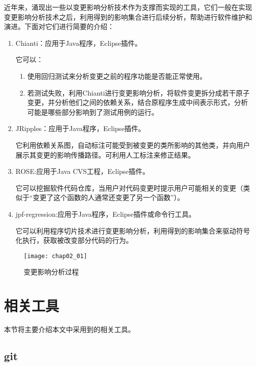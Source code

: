 近年来，涌现出一些以变更影响分析技术作为支撑而实现的工具，它们一般在实现变更影响分析技术之后，利用得到的影响集合进行后续分析，帮助进行软件维护和演进。下面对它们进行简要的介绍：
\begin{enumerate}
	\item Chianti：应用于Java程序，Eclipse插件\cite{ren2004chianti}。

	它可以：
	\begin{enumerate}
	
		\item 使用回归测试来分析变更之前的程序功能是否能正常使用。
		\item 若测试失败，利用Chianti进行变更影响分析，将软件变更拆分成若干原子变更，并分析他们之间的依赖关系，结合原程序生成中间表示形式，分析可能是哪些部分影响到了测试用例的运行。
	\end{enumerate}
	
	
	\item JRipples：应用于Java程序，Eclipse插件\cite{buckner2005jripples,rajlich2004incremental}。
	
	它利用依赖关系图，自动标注可能受到被变更的类所影响的其他类，并向用户展示其变更的影响传播路径。可利用人工标注来修正结果。
	
	\item ROSE:应用于Java CVS工程，Eclipse插件\cite{zimmermann2005mining}。

	它可以挖掘软件代码仓库，当用户对代码变更时提示用户可能相关的变更（类似于“变更了这个函数的人通常还变更了另一个函数”）。
	
	
	\item jpf-regression:应用于Java程序，Eclipse插件或命令行工具\cite{person2011directed}。

	它可以利用程序切片技术进行变更影响分析，利用得到的影响集合来驱动符号化执行，获取被改变部分代码的行为。
\end{enumerate}

\begin{figure}[H]
	\centering
	\texttt{[image: chap02\_01]}
	\caption {变更影响分析过程}
	\label {变更影响分析process} 
\end{figure}

\section{相关工具}
	本节将主要介绍本文中采用到的相关工具。
	

	\subsection{git}		

